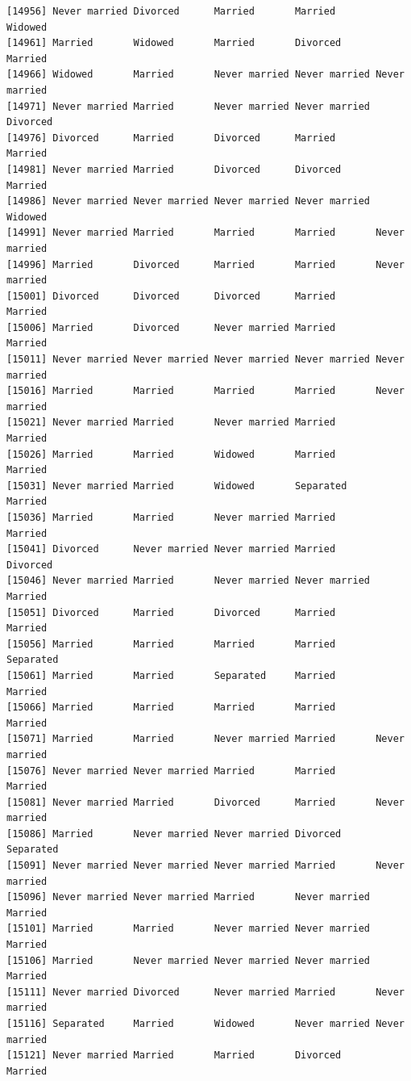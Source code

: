 \documentclass[
  letterpaper,
  DIV=11,
  numbers=noendperiod,
  oneside]{scrartcl}
\begin{document}
\begin{verbatim}
[14956] Never married Divorced      Married       Married       Widowed      
[14961] Married       Widowed       Married       Divorced      Married      
[14966] Widowed       Married       Never married Never married Never married
[14971] Never married Married       Never married Never married Divorced     
[14976] Divorced      Married       Divorced      Married       Married      
[14981] Never married Married       Divorced      Divorced      Married      
[14986] Never married Never married Never married Never married Widowed      
[14991] Never married Married       Married       Married       Never married
[14996] Married       Divorced      Married       Married       Never married
[15001] Divorced      Divorced      Divorced      Married       Married      
[15006] Married       Divorced      Never married Married       Married      
[15011] Never married Never married Never married Never married Never married
[15016] Married       Married       Married       Married       Never married
[15021] Never married Married       Never married Married       Married      
[15026] Married       Married       Widowed       Married       Married      
[15031] Never married Married       Widowed       Separated     Married      
[15036] Married       Married       Never married Married       Married      
[15041] Divorced      Never married Never married Married       Divorced     
[15046] Never married Married       Never married Never married Married      
[15051] Divorced      Married       Divorced      Married       Married      
[15056] Married       Married       Married       Married       Separated    
[15061] Married       Married       Separated     Married       Married      
[15066] Married       Married       Married       Married       Married      
[15071] Married       Married       Never married Married       Never married
[15076] Never married Never married Married       Married       Married      
[15081] Never married Married       Divorced      Married       Never married
[15086] Married       Never married Never married Divorced      Separated    
[15091] Never married Never married Never married Married       Never married
[15096] Never married Never married Married       Never married Married      
[15101] Married       Married       Never married Never married Married      
[15106] Married       Never married Never married Never married Married      
[15111] Never married Divorced      Never married Married       Never married
[15116] Separated     Married       Widowed       Never married Never married
[15121] Never married Married       Married       Divorced      Married      

\end{verbatim}
\end{document}

